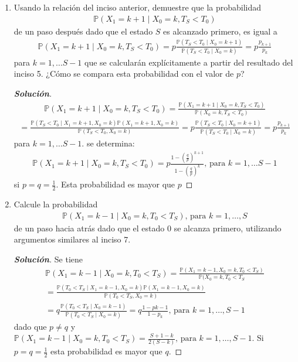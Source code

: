 \documentclass[12pt, letterpaper]{article}
\newcommand{\p}{\mathbb{P}}
\newenvironment{manualtheorem}[1]{%
  \renewcommand\themanualtheoreminner{#1}%
  \manualtheoreminner
}{\endmanualtheoreminner}
\newenvironment{solucion}
  {\renewcommand\qedsymbol{$\square$}\begin{proof}[\textbf{Solución}]}
  {\end{proof}}
\begin{document}
\begin{manualtheorem}{3.2}
\begin{enumerate}
        \item Usando la relación del inciso anterior, demuestre que la probabilidad
        \begin{align*}
            \p(X_1=k+1\mid X_0=k, T_S < T_0)
        \end{align*}
        de un paso después dado que el estado $S$ es alcanzado primero, es igual a
        \begin{align*}
            \p(X_1=k+1\mid X_0=k, T_S < T_0)=p\frac{\p(T_S < T_0\mid X_0=k+1)}{\p(T_S < T_0\mid X_0=k)}=p\frac{p_{k+1}}{p_k}
        \end{align*}
        para $k=1,\dots S-1$ que se calcularán explícitamente a partir del resultado del inciso 5. ¿Cómo se compara esta probabilidad con el valor de $p$?
        \begin{solucion}
            \begin{align*}
                \p(X_1=k+1\mid X_0=k, T_S < T_0)=\frac{\p(X_1=k+1\mid X_0=k, T_S < T_0)}{\p(X_0=k,T_S < T_0)}
            \end{align*}
            \begin{align*}
                =\frac{\p(T_S < T_0\mid X_1=k+1,X_0=k)\p(X_1=k+1,X_0=k)}{\p(T_S < T_0, X_0=k)}=p\frac{\p(T_S < T_0\mid X_0=k+1)}{\p(T_S < T_0\mid X_0=k)}=p\frac{p_{k+1}}{p_k}
            \end{align*}
            para $k=1,\dots S-1$. se determina:
            \begin{align*}
                \p(X_1=k+1\mid X_0=k, T_S < T_0)=p\frac{1-(\frac{q}{p})^{k+1}}{1-(\frac{q}{p})^{k}}\textrm{, para }k=1,\dots S-1
            \end{align*}
            si $p=q=\frac{1}{2}$. Esta probabilidad es mayor que $p$
        \end{solucion}
        
        \item Calcule la probabilidad
        \begin{align*}
            \p(X_1=k-1 \mid X_0 = k, T_0<T_S)\textrm{, para }k=1,\dots,S
        \end{align*}
        de un paso hacia atrás dado que el estado 0 se alcanza primero, utilizando argumentos similares al inciso 7.
        \begin{solucion}
            Se tiene
            \begin{align*}
                \p(X_1=k-1 \mid X_0 = k, T_0<T_S)=\frac{\p(X_1=k-1, X_0 = k, T_0<T_S)}{\p(X_0=k,T_0<T_S}\\[0.2pt]
                =\frac{\p(T_0<T_S\mid X_1=k-1,X_0=k)\p(X_1=k-1,X_0=k)}{\p(T_0<T_S, X_0=k)}\\
                =q\frac{\p(T_0<T_S \mid X_0= k-1)}{\p(T_0<T_S\mid X_0= k)}=q\frac{1-p{k-1}}{1-p_k}\textrm{, para }k=1,\dots,S-1
            \end{align*}
            dado que $p\neq q $ y $\p(X_1=k-1\mid X_0=k,T_0<T_S)=\frac{S+1-k}{2(S-k)}\textrm{, para }k=1,\dots,S-1$. Si $p=q=\frac{1}{2}$ esta probabilidad es mayor que $q$.
        \end{solucion}
        

\end{enumerate}
\end{manualtheorem}
\end{document}
